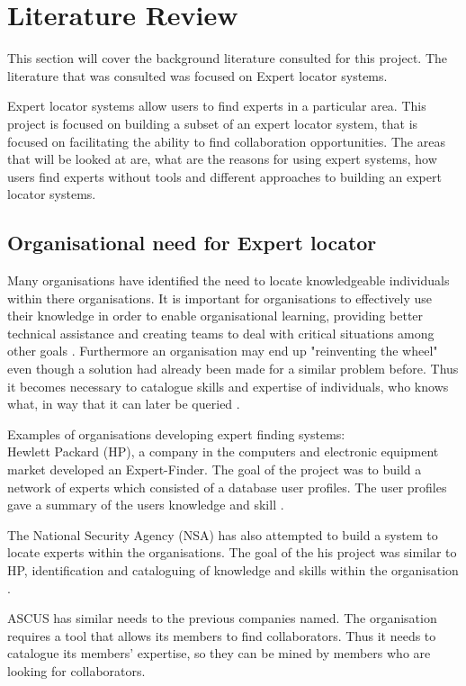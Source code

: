 \documentclass[a4paper,oneside,11pt]{report}
\begin{document}
\chapter{Literature Review}
This section will cover the background literature consulted for this project. The literature that was consulted was focused on Expert locator systems. 

Expert locator systems allow users to find experts in a particular area.
This project is focused on building a subset of an expert locator system, that is focused on facilitating the ability to find collaboration opportunities. The areas that will be looked at are, what are the reasons for using expert systems, how users find experts without tools and different approaches to building an expert locator systems.
\section{Organisational need for Expert locator}
Many organisations have identified the need to locate knowledgeable individuals within there organisations. It is important for organisations to effectively use their knowledge in order to enable organisational learning, providing better technical assistance and creating teams to deal with critical situations among other goals  \autocite{ackerman2003sharing}. Furthermore an organisation may end up "reinventing the wheel" even though a solution had already been made for a similar problem before. Thus it becomes necessary to catalogue skills and expertise of individuals, who knows what,  in way that it can later be queried \autocite{fernandez2000}.

Examples of organisations developing expert finding systems: \\
Hewlett Packard (HP), a company in the computers and electronic equipment market developed  an Expert-Finder. The goal of the project was to build a network of experts which consisted of a database user profiles. The user profiles gave a summary of the users knowledge and skill \autocite{fernandez2000}.
 
The National Security Agency (NSA) has also attempted to build a system to locate experts within the organisations. The goal of the his project was similar to HP, identification and cataloguing of knowledge and skills within the organisation \autocite{fernandez2000}.

ASCUS has similar needs to the previous companies named. The organisation requires a tool that allows its members to find collaborators. Thus it needs to catalogue its members' expertise, so they can be mined by members who are looking for collaborators. 
	
\end{document}
